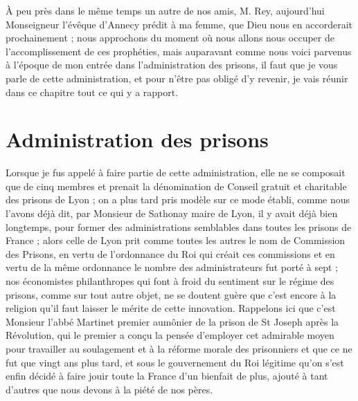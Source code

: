 \documentclass[11pt,a4paper]{report}
\begin{document}
À peu près dans le même temps un autre de nos amis, M. Rey, aujourd'hui Monseigneur l'évêque d'Annecy prédit à ma femme, que Dieu nous en accorderait prochainement ; nous approchons du moment où nous allons nous occuper de l'accomplissement de ces prophéties, mais auparavant comme nous voici parvenus à l'époque de mon entrée dans l'administration des prisons, il faut que je vous parle de cette administration, et pour n'être pas obligé d'y revenir, je vais réunir dans ce chapitre tout ce qui y a rapport.

\section*{Administration des prisons}

Lorsque je fus appelé à faire partie de cette administration, elle ne se composait que de cinq membres et prenait la dénomination de Conseil gratuit et charitable des prisons de Lyon ; on a plus tard pris modèle sur ce mode établi, comme nous l'avons déjà dit, par Monsieur de Sathonay maire de Lyon, il y avait déjà bien longtemps, pour former des administrations semblables dans toutes les prisons de France ; alors celle de Lyon prit comme toutes les autres le nom de Commission des Prisons, en vertu de l'ordonnance du Roi qui créait ces commissions et en vertu de la même ordonnance le nombre des administrateurs fut porté à sept ; nos économistes philanthropes qui font à froid du sentiment sur le régime des prisons, comme sur tout autre objet, ne se doutent guère que c'est encore à la religion qu'il faut laisser le mérite de cette innovation. Rappelons ici que c'est Monsieur l'abbé Martinet premier aumônier de la prison de St Joseph après la Révolution, qui le premier a conçu la pensée d'employer cet admirable moyen pour travailler au soulagement et à la réforme morale des prisonniers et que ce ne fut que vingt ans plus tard, et sous le gouvernement du Roi légitime qu'on s'est enfin décidé à faire jouir toute la France d'un bienfait de plus, ajouté à tant d'autres que nous devons à la piété de nos pères.
\end{document}
